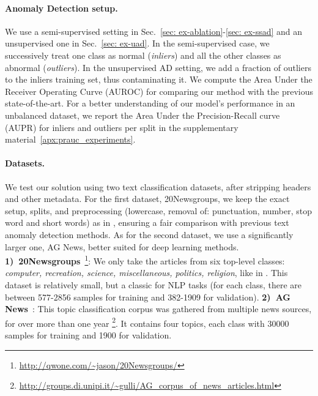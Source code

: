\documentclass[11pt]{article}
\begin{document}
\paragraph{Anomaly Detection setup.} We use a semi-supervised setting in Sec.~\ref{sec: ex-ablation}-\ref{sec: ex-ssad} and an unsupervised one in Sec.~\ref{sec: ex-uad}. In the semi-supervised case, we successively treat one class as normal (\emph{inliers}) and all the other classes as abnormal (\emph{outliers}). In the unsupervised AD setting, we add a fraction of outliers to the inliers training set, thus contaminating it. We compute the Area Under the Receiver Operating Curve (AUROC) for comparing our method with the previous state-of-the-art. For a better understanding of our model's performance in an unbalanced dataset, we report the Area Under the Precision-Recall curve (AUPR) for inliers and outliers per split in the supplementary material~\ref{apx:prauc_experiments}.

\paragraph{Datasets.} We test our solution using two text classification datasets, after stripping headers and other metadata. For the first dataset, 20Newsgroups, we keep the exact setup, splits, and preprocessing (lowercase, removal of: punctuation, number, stop word and short words) as in \cite{acl2019}, ensuring a fair comparison with previous text anomaly detection methods. As for the second dataset, we use a significantly larger one, AG News, better suited for deep learning methods. \textbf{1)~20Newsgroups}~\footnote{\url{http://qwone.com/~jason/20Newsgroups/}}: We only take the articles from six top-level classes: \emph{computer, recreation, science, miscellaneous, politics, religion}, like in \cite{acl2019}. This dataset is relatively small, but a classic for NLP tasks (for each class, there are between 577-2856 samples for training and 382-1909 for validation). \textbf{2)~AG News}~\cite{ag_news}: This topic classification corpus was gathered from multiple news sources, for over more than one year \footnote{\url{http://groups.di.unipi.it/~gulli/AG_corpus_of_news_articles.html}}. It contains four topics, each class with 30000 samples for training and 1900 for validation.
\end{document}
